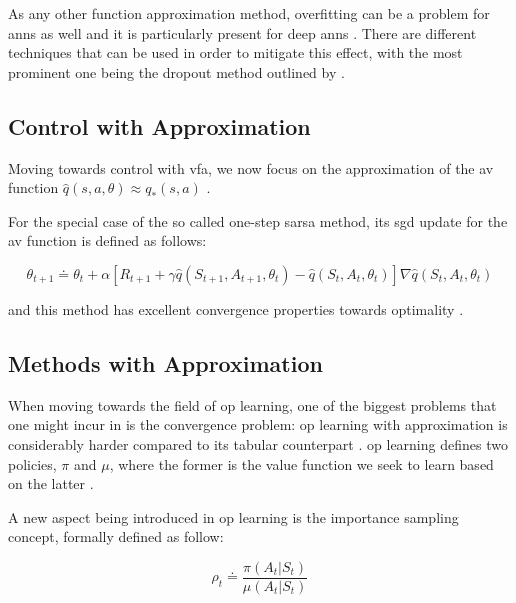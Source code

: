 \documentclass[draft=false]{seal_thesis}
\begin{document}
As any other function approximation method, overfitting can be a problem for \glspl{ann} as well and it is particularly present for deep \glspl{ann} \citep[p. 218]{Sutton2017}. There are different techniques that can be used in order to mitigate this effect, with the most prominent one being the dropout method outlined by \citet{Srivastava2014}.

\subsection{ Control with Approximation}
\label{subsec:onpol_control}

Moving towards control with \gls{vfa}, we now focus on the approximation of the \gls{av} function $\hat{q} (s,a,\theta) \approx q_* (s,a)$ \citep[p. 229]{Sutton2017}.

For the special case of the so called one-step \gls{sarsa} method, its \gls{sgd} update for the \gls{av} function is defined as follows:

\begin{equation}
	\theta_{t+1} \doteq \theta_t + \alpha [ R_{t+1} + \gamma \hat{q} (S_{t+1}, A_{t+1}, \theta_t) - \hat{q} (S_t, A_t, \theta_t) ] \nabla \hat{q} (S_t, A_t, \theta_t)
\end{equation}

and this method has excellent convergence properties towards optimality \citep[p. 230]{Sutton2017}.

\subsection{ Methods with Approximation}
\label{subsec:offpol_methods}

When moving towards the field of \gls{op} learning, one of the biggest problems that one might incur in is the convergence problem: \gls{op} learning with approximation is considerably harder compared to its tabular counterpart \citep[p. 243]{Sutton2017}. \gls{op} learning defines two policies, $\pi$ and $\mu$, where the former is the value function we seek to learn based on the latter \citep[p. 243]{Sutton2017}.

A new aspect being introduced in \gls{op} learning is the importance sampling concept, formally defined as follow:

\begin{equation}
\label{eq:importance_sampling}
	\rho_t \doteq \frac{\pi(A_t|S_t)}{\mu(A_t|S_t)}
\end{equation}
\end{document}
